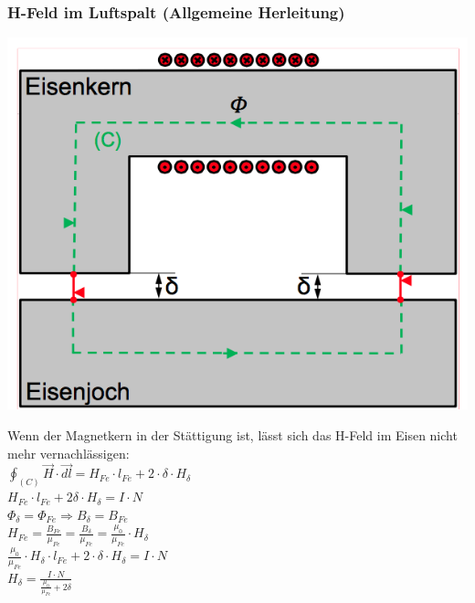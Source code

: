 \subsubsection{H-Feld im Luftspalt (Allgemeine Herleitung)}
\begin{minipage}{0.4 \linewidth}
\includegraphics[width = \linewidth]{./Pics/VL2/magKreis}
\end{minipage}
\begin{minipage}{0.6 \linewidth}
Wenn der Magnetkern in der Stättigung ist, lässt sich das H-Feld im Eisen nicht mehr vernachlässigen: \\

$\oint_{(C)} \vec{H} \cdot \vec{dl} = H_{Fe} \cdot l_{Fe} + 2 \cdot \delta \cdot H_{\delta} $ \\

$H_{Fe} \cdot l_{Fe} + 2 \delta \cdot H_{\delta} = I \cdot N$ \\

$\Phi_{\delta} = \Phi_{Fe} \Rightarrow B_{\delta} = B_{Fe}$ \\

$H_{Fe} = \frac{B_{Fe}}{\mu_{Fe}} = \frac{B_{\delta}}{\mu_{Fe}} = \frac{\mu_0}{\mu_{Fe}} \cdot H_{\delta}$\\

$\frac{\mu_0}{\mu_{Fe}} \cdot H_{\delta} \cdot l_{Fe} + 2 \cdot \delta \cdot H_{\delta} = I \cdot N$\\

\textbf{$H_{\delta} = \frac{I \cdot N}{\frac{\mu_0}{\mu_{Fe}}+ 2 \delta}$}
\end{minipage}

